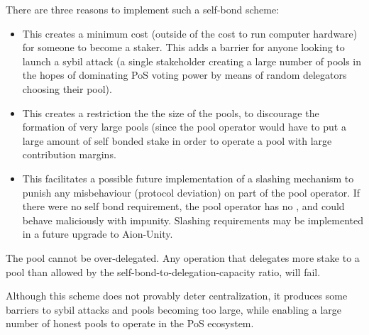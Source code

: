 There are three reasons to implement such a self-bond scheme:
\begin{itemize}
    \item This creates a minimum cost (outside of the cost to run computer hardware) for someone to become a staker. This adds a barrier for anyone looking to launch a sybil attack (a single stakeholder creating a large number of pools in the hopes of dominating PoS voting power by means of random delegators choosing their pool). 
    \item This creates a restriction the the size of the pools, to discourage the formation of very large pools (since the pool operator would have to put a large amount of self bonded stake in order to operate a pool with large contribution margins.
    \item This facilitates a possible future implementation of a slashing mechanism to punish any misbehaviour (protocol deviation) on part of the pool operator. If there were no self bond requirement, the pool operator has no , and could behave maliciously with impunity. Slashing requirements may be implemented in a future upgrade to Aion-Unity. 
\end{itemize}

The pool cannot be over-delegated. Any operation that delegates more stake to a pool than allowed by the self-bond-to-delegation-capacity ratio, will fail. 

Although this scheme does not provably deter centralization, it produces some barriers to sybil attacks and pools becoming too large, while enabling a large number of honest pools to operate in the PoS ecosystem.  

